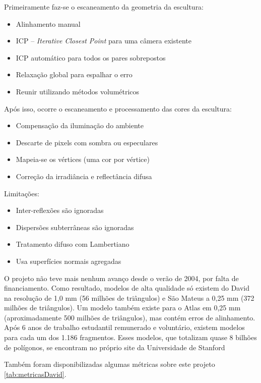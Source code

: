 Primeiramente faz-se o escaneamento da geometria da escultura:

\begin{itemize}
\item{Alinhamento manual}
\item{ICP -- \emph{Iterative Closest Point} para uma câmera existente} %
\item{ICP automático para todos os pares sobrepostos}
\item{Relaxação global para espalhar o erro}
\item{Reunir utilizando métodos volumétricos}
\end{itemize}


Após isso, ocorre o escaneamento e processamento das cores da escultura:

\begin{itemize}
\item{Compensação da iluminação do ambiente}
\item{Descarte de pixels com sombra ou especulares}
\item{Mapeia-se os vértices (uma cor por vértice)}
\item{Correção da irradiância e reflectância difusa}
\end{itemize}

Limitações:
\begin{itemize}
\item{Inter-reflexões são ignoradas}
\item{Dispersões subterrâneas são ignoradas}
\item{Tratamento difuso com Lambertiano} %
\item{Usa superfícies normais agregadas}
\end{itemize}

O projeto não teve mais nenhum avanço desde o verão de 2004, por falta de financiamento. Como resultado, modelos de alta qualidade só existem do David na resolução de 1,0 mm (56 milhões de triângulos) e São Mateus a 0,25 mm (372 milhões de triângulos). Um modelo também existe para o Atlas em 0,25 mm (aproximadamente 500 milhões de triângulos), mas contém erros de alinhamento. Após 6 anos de trabalho estudantil remunerado e voluntário, existem modelos para cada um dos 1.186 fragmentos. Esses modelos, que totalizam quase 8 bilhões de polígonos, se encontram no próprio site da Universidade de Stanford %

Também foram disponibilizadas algumas métricas sobre este projeto \ref{tab:metricasDavid}.

